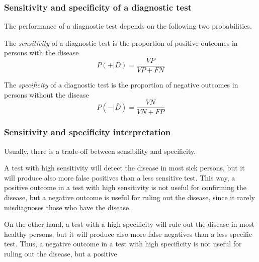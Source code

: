\begin{frame}
\frametitle{Sensitivity and specificity of a diagnostic test}
The performance of a diagnostic test depends on the following two probabilities.
\begin{definition}[Sensitivity]
The \emph{sensitivity} of a diagnostic test is the proportion of positive outcomes in persons with the disease 
\[
P(+|D)=\frac{VP}{VP+FN}
\]
\end{definition}

\begin{definition}[Specificity]
The \emph{specificity} of a diagnostic test is the proportion of negative outcomes in persons without the disease
\[
P(-|\bar D)=\frac{VN}{VN+FP}
\]
\end{definition}
\end{frame}


\begin{frame}
\frametitle{Sensitivity and specificity interpretation}
Usually, there is a trade-off between sensibility and specificity.  

A test with high sensitivity will detect the disease in most sick persons, but it will produce also more false positives
than a less sensitive test. 
This way, a positive outcome in a test with high sensitivity is not useful for confirming the disease, but a negative
outcome is useful for ruling out the disease, since it rarely misdiagnoses those who have the disease.

On the other hand, a test with a high specificity will rule out the disease in most healthy persons, but it will produce
also more false negatives than a less specific test. 
Thus, a negative outcome in a test with high specificity is not useful for ruling out the disease, but a positive
\end{frame}


